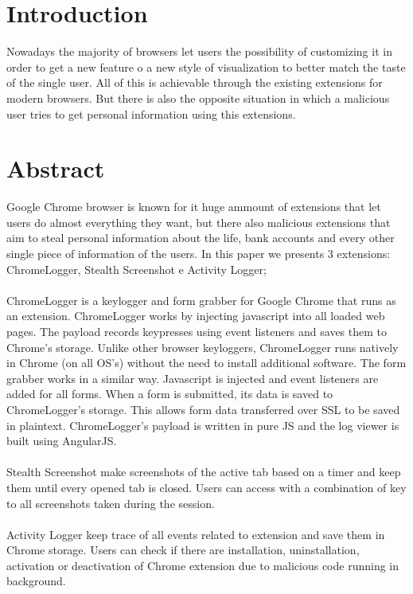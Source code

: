 \documentclass[12pt]{article}
\begin{document}
\begin{multicols}{2}
	\section*{Introduction}
	Nowadays the majority of browsers let users the possibility of customizing it in order to get a new feature o a new style of visualization to better match the taste of the single user.
	All of this is achievable through the existing extensions for modern browsers. But there is also the opposite situation in which a malicious user tries to get personal information using this extensions.
	
	\section*{Abstract}
	Google Chrome browser is known for it huge ammount of extensions that let users do almost everything they want, but there also malicious extensions that aim to steal personal information about the life, bank accounts and every other single piece of information of the users. In this paper we presents 3 extensions: ChromeLogger\cite{ChromeLogger}, Stealth Screenshot e Activity Logger;\\ \\
	ChromeLogger is a keylogger and form grabber for Google Chrome that runs as an extension.	
	ChromeLogger works by injecting javascript into all loaded web pages. The payload records keypresses using event listeners and saves them to Chrome's storage. Unlike other browser keyloggers, ChromeLogger runs natively in Chrome (on all OS's) without the need to install additional software.
	The form grabber works in a similar way. Javascript is injected and event listeners are added for all forms. When a form is submitted, its data is saved to ChromeLogger's storage. This allows form data transferred over SSL to be saved in plaintext.
	ChromeLogger's payload is written in pure JS and the log viewer is built using AngularJS.\\ \\
	Stealth Screenshot make screenshots of the active tab based on a timer and keep them until every opened tab is closed. Users can access with a combination of key to all screenshots taken during the session.\\ \\
	Activity Logger keep trace of all events related to extension and save them in Chrome storage. Users can check if there are installation, uninstallation, activation or deactivation of Chrome extension due to malicious code running in background.

\end{multicols}
\end{document}
